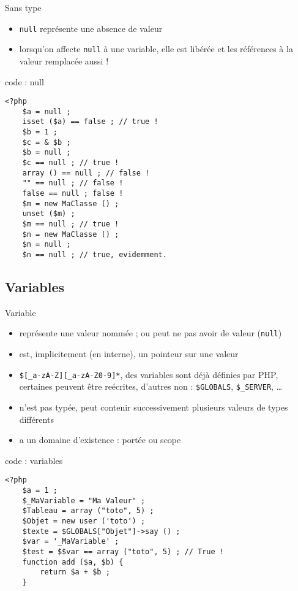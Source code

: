 \begin{frame}[containsverbatim]{Sans type}
\begin{itemize}
\item \texttt{null} représente une absence de valeur
\item lorsqu'on affecte \texttt{null} à une variable, elle est libérée et les références à la valeur remplacée aussi !
\end{itemize}
\begin{block}{code : null}
\begin{lstlisting}
<?php
	$a = null ;
	isset ($a) == false ; // true !
	$b = 1 ;
	$c = & $b ;
	$b = null ;
	$c == null ; // true !
	array () == null ; // false !
	"" == null ; // false !
	false == null ; false !
	$m = new MaClasse () ;
	unset ($m) ;
	$m == null ; // true !
	$n = new MaClasse () ;
	$n = null ;
	$n == null ; // true, evidemment.
\end{lstlisting}
\end{block}
\end{frame}

\subsection{Variables}

\begin{frame}[containsverbatim]{Variable}
\begin{itemize}
\item représente une valeur nommée ; ou peut ne pas avoir de valeur (\texttt{null})
\item est, implicitement (en interne), un pointeur sur une valeur
\item \texttt{\$[\_a-zA-Z][\_a-zA-Z0-9]*}, des variables sont déjà définies par PHP, certaines peuvent être reécrites, d'autres non : \texttt{\$GLOBALS}, \texttt{\$\_SERVER}, \ldots
\item n'est pas typée, peut contenir successivement plusieurs valeurs de types différents
\item a un domaine d'existence : portée ou scope
\end{itemize}
\begin{block}{code : variables}
\begin{lstlisting}
<?php
	$a = 1 ;
	$_MaVariable = "Ma Valeur" ;
	$Tableau = array ("toto", 5) ;
	$Objet = new user ('toto') ;
	$texte = $GLOBALS["Objet"]->say () ;
	$var = '_MaVariable' ;
	$test = $$var == array ("toto", 5) ; // True !
	function add ($a, $b) {
		return $a + $b ;
	}
\end{lstlisting}
\end{block}
\end{frame}


